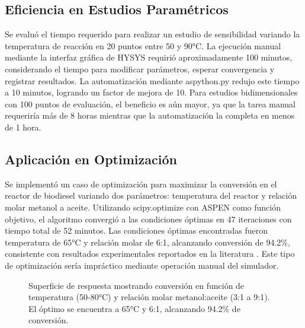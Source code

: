 \documentclass{syx7}
\begin{document}
\subsection{Eficiencia en Estudios Paramétricos}

Se evaluó el tiempo requerido para realizar un estudio de sensibilidad variando la temperatura de reacción en 20 puntos entre 50 y 90°C. La ejecución manual mediante la interfaz gráfica de HYSYS requirió aproximadamente 100 minutos, considerando el tiempo para modificar parámetros, esperar convergencia y registrar resultados. La automatización mediante aspython.py redujo este tiempo a 10 minutos, logrando un factor de mejora de 10. Para estudios bidimensionales con 100 puntos de evaluación, el beneficio es aún mayor, ya que la tarea manual requeriría más de 8 horas mientras que la automatización la completa en menos de 1 hora.

\subsection{Aplicación en Optimización}

Se implementó un caso de optimización para maximizar la conversión en el reactor de biodiesel variando dos parámetros: temperatura del reactor y relación molar metanol a aceite. Utilizando scipy.optimize \cite{virtanen2020scipy} con ASPEN como función objetivo, el algoritmo convergió a las condiciones óptimas en 47 iteraciones con tiempo total de 52 minutos. Las condiciones óptimas encontradas fueron temperatura de 65°C y relación molar de 6:1, alcanzando conversión de 94.2\%, consistente con resultados experimentales reportados en la literatura \cite{tapanes2008transesterification}. Este tipo de optimización sería impráctico mediante operación manual del simulador.

\begin{figure}[htb!]
	\centering
	\caption{Superficie de respuesta mostrando conversión en función de temperatura (50-80°C) y relación molar metanol:aceite (3:1 a 9:1). El óptimo se encuentra a 65°C y 6:1, alcanzando 94.2\% de conversión.}
	\label{fig:superficie_optimizacion}
\end{figure}

\end{document}

